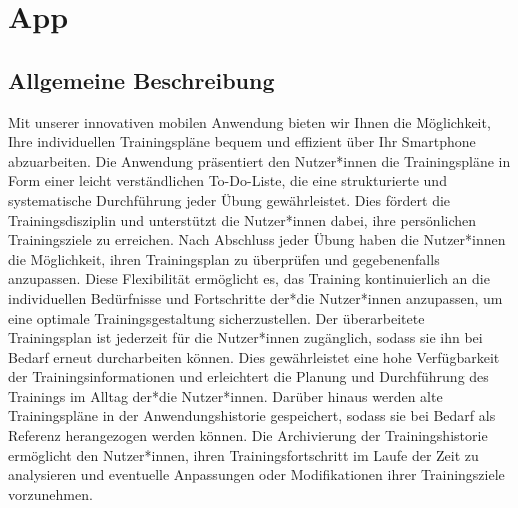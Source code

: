 \section{App}
\subsection{Allgemeine Beschreibung}
Mit unserer innovativen mobilen Anwendung bieten wir Ihnen die Möglichkeit, Ihre individuellen Trainingspläne bequem und effizient über Ihr Smartphone abzuarbeiten. Die Anwendung präsentiert den Nutzer*innen die Trainingspläne in Form einer leicht verständlichen To-Do-Liste, die eine strukturierte und systematische Durchführung jeder Übung gewährleistet. Dies fördert die Trainingsdisziplin und unterstützt die Nutzer*innen dabei, ihre persönlichen Trainingsziele zu erreichen.
\newline
\newline
Nach Abschluss jeder Übung haben die Nutzer*innen die Möglichkeit, ihren Trainingsplan zu überprüfen und gegebenenfalls anzupassen. Diese Flexibilität ermöglicht es, das Training kontinuierlich an die individuellen Bedürfnisse und Fortschritte der*die Nutzer*innen anzupassen, um eine optimale Trainingsgestaltung sicherzustellen.
\newline
\newline
Der überarbeitete Trainingsplan ist jederzeit für die Nutzer*innen zugänglich, sodass sie ihn bei Bedarf erneut durcharbeiten können. Dies gewährleistet eine hohe Verfügbarkeit der Trainingsinformationen und erleichtert die Planung und Durchführung des Trainings im Alltag der*die Nutzer*innen.
\newpage
Darüber hinaus werden alte Trainingspläne in der Anwendungshistorie gespeichert, sodass sie bei Bedarf als Referenz herangezogen werden können. Die Archivierung der Trainingshistorie ermöglicht den Nutzer*innen, ihren Trainingsfortschritt im Laufe der Zeit zu analysieren und eventuelle Anpassungen oder Modifikationen ihrer Trainingsziele vorzunehmen.

